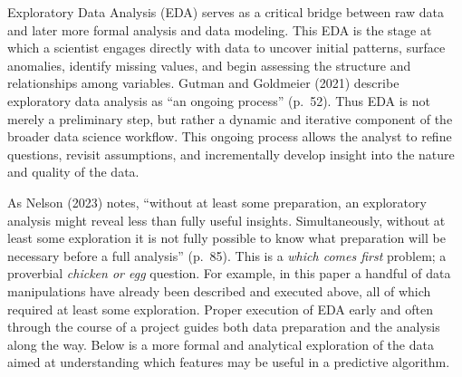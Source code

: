 \documentclass[
]{article}
\begin{document}
Exploratory Data Analysis (EDA) serves as a critical bridge between raw
data and later more formal analysis and data modeling. This EDA is the
stage at which a scientist engages directly with data to uncover initial
patterns, surface anomalies, identify missing values, and begin
assessing the structure and relationships among variables. Gutman and
Goldmeier (2021) describe exploratory data analysis as ``an ongoing
process'' (p.~52). Thus EDA is not merely a preliminary step, but rather
a dynamic and iterative component of the broader data science workflow.
This ongoing process allows the analyst to refine questions, revisit
assumptions, and incrementally develop insight into the nature and
quality of the data.

As Nelson (2023) notes, ``without at least some preparation, an
exploratory analysis might reveal less than fully useful insights.
Simultaneously, without at least some exploration it is not fully
possible to know what preparation will be necessary before a full
analysis'' (p.~85). This is a \emph{which comes first} problem; a
proverbial \emph{chicken or egg} question. For example, in this paper a
handful of data manipulations have already been described and executed
above, all of which required at least some exploration. Proper execution
of EDA early and often through the course of a project guides both data
preparation and the analysis along the way. Below is a more formal and
analytical exploration of the data aimed at understanding which features
may be useful in a predictive algorithm.
\end{document}
